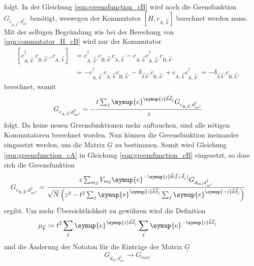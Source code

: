 folgt.
In der Gleichung \eqref{eqn:greensfunction_cB} wird noch die Geensfunktion $G_{c_{\text{A},\vec{k}},d^\dagger_{m'}}$ benötigt, weswegen der Kommutator
$\left [H, c_{\text{A},\vec{k}} \right ]$ berechnet werden muss.
Mit der selbigen Begründung wie bei der Berechung von \eqref{eqn:commutator_H_cB} wird nur der Kommutator
\begin{align*}
    \left [ c^\dagger_{\text{A},\vec{k}'} c_{\text{B},\vec{k}'}, c_{\text{A},\vec{k}} \right ]  &= c^\dagger_{\text{A},\vec{k}'}  c_{\text{B},\vec{k}'} c_{\text{A},\vec{k}}
    - c_{\text{A},\vec{k}} c^\dagger_{\text{A},\vec{k}'} c_{\text{B},\vec{k}'} \\
    &= - c^\dagger_{\text{A},\vec{k}'}  c_{\text{A},\vec{k}} c_{\text{B},\vec{k}'} - \delta_{\vec{k}\vec{k}'} c_{\text{B},\vec{k}'} 
    + c_{\text{A},\vec{k}} c^\dagger_{\text{A},\vec{k}'} = - \delta_{\vec{k}\vec{k}'} c_{\text{B},\vec{k}'} 
\end{align*}
berechnet, womit 
\begin{equation}
    G_{c_{\text{A},\vec{k}},d^\dagger_{m'}} = - \frac{t \sum_{j}\symup{e}^{\symup{i}\vec{k}\vec{\delta}_j} G_{c_{\text{B},\vec{k}}, d^\dagger_{m'}}} {z} \label{eqn:greensfunction_cA}
\end{equation}
folgt.
Da keine neuen Greensfunktionen mehr auftauchen, sind alle nötigen Kommutatoren berechnet worden. 
Nun können die Greensfunktion ineinander eingesetzt werden, um die Matrix $\underline{\underline{G}}$ zu bestimmen.
Somit wird Gleichung \eqref{eqn:greensfunction_cA} in Gleichung \eqref{eqn:greensfunction_cB} eingesetzt, so dass sich die Greensfunktion
\begin{equation}
    G_{c_{\text{B},\vec{k}}, d^\dagger_{m'}} = \frac{z\sum_{mj} V_{mj} \symup{e}^{-\symup{i}\vec{k} (\vec{l}+\vec{\delta}_j)} G_{d_m, d_{m'}^\dagger}}
    {\sqrt{N}\left ( z^2-t^2\sum_j \symup{e}^{\symup{i}\vec{k}\vec{\delta}_j} \sum_j \symup{e}^{\symup{-i}\vec{k}\vec{\delta}_j} \right )} \label{eqn:finalgreencB}
\end{equation}
ergibt.
Um mehr Übersichtlichkeit zu gewähren wird die Definition
\begin{equation*}
     \mu_{\vec{k}} \coloneq t^2 \sum_j \symup{e}^{\symup{i}\vec{k}\vec{\delta}_j} \sum_j \symup{e}^{-\symup{i}\vec{k}\vec{\delta}_j} 
\end{equation*}  
und die Änderung der Notaton für die Einträge der Matrix $\underline{\underline{G}}$
\begin{equation*}
    G_{d_m, d^\dagger_{m'}} \to G_{mm'}
\end{equation*}
